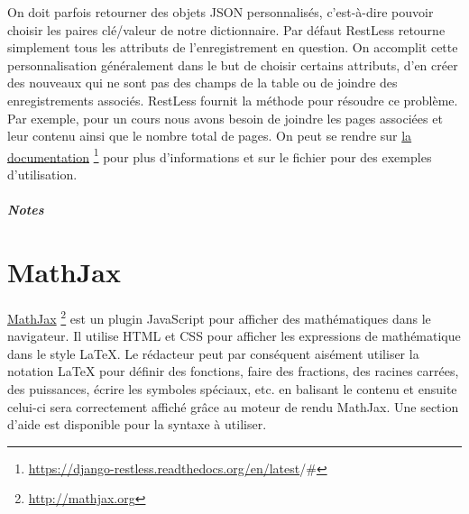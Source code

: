 \documentclass[letterpaper,10pt,oneside]{sphinxmanual}
\begin{document}
On doit parfois retourner des objets JSON personnalisés, c'est-à-dire pouvoir choisir les paires clé/valeur de notre dictionnaire. Par défaut RestLess retourne simplement tous les attributs de l'enregistrement en question. On accomplit cette personnalisation généralement dans le but de choisir certains attributs, d'en créer des nouveaux qui ne sont pas des champs de la table ou de joindre des enregistrements associés. RestLess fournit la méthode  pour résoudre ce problème. Par exemple, pour un cours nous avons besoin de joindre les pages associées et leur contenu ainsi que le nombre total de pages. On peut se rendre sur \href{https://django-restless.readthedocs.org/en/latest/\#}{la documentation} \footnote{
\href{https://django-restless.readthedocs.org/en/latest}{https://django-restless.readthedocs.org/en/latest}/\#
} pour plus d'informations et sur le fichier  pour des exemples d'utilisation.
\paragraph{Notes}


\chapter{MathJax}
\label{maths:mathjax}\label{maths::doc}
\href{http://mathjax.org}{MathJax} \footnote{
\href{http://mathjax.org}{http://mathjax.org}
} est un plugin JavaScript pour afficher des mathématiques dans le navigateur. Il utilise HTML et CSS pour afficher les expressions de mathématique dans le style LaTeX. Le rédacteur peut par conséquent aisément utiliser la notation LaTeX pour définir des fonctions, faire des fractions, des racines carrées, des puissances, écrire les symboles spéciaux, etc. en balisant le contenu et ensuite celui-ci sera correctement affiché grâce au moteur de rendu MathJax. Une section d'aide est disponible pour la syntaxe à utiliser.
\end{document}
